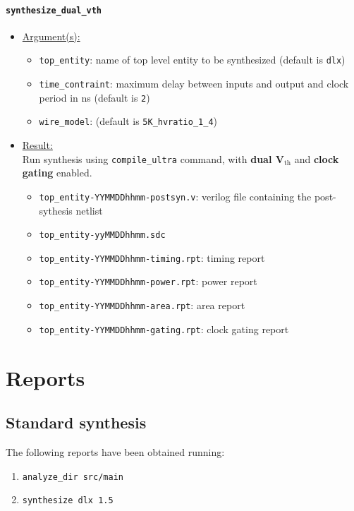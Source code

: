 \paragraph{\texttt{synthesize\_dual\_vth}}
\begin{itemize}
	\item \underline{Argument(s):}
		\begin{itemize}
			\item \texttt{top\_entity}: name of top level entity to
				be synthesized (default is \texttt{dlx})
			\item \texttt{time\_contraint}: maximum delay between
				inputs and output and clock period in ns
				(default is \texttt{2})
			\item \texttt{wire\_model}: (default is \texttt{5K\_hvratio\_1\_4})
		\end{itemize}
	\item \underline{Result:} \\
		Run synthesis using \texttt{compile\_ultra} command, with
		\textbf{dual V$_{\text{th}}$} and \textbf{clock gating} enabled.
		\begin{itemize}
			\item \texttt{top\_entity-YYMMDDhhmm-postsyn.v}: verilog
				file containing the post-sythesis netlist
			\item \texttt{top\_entity-yyMMDDhhmm.sdc}
			\item \texttt{top\_entity-YYMMDDhhmm-timing.rpt}: timing
				report
			\item \texttt{top\_entity-YYMMDDhhmm-power.rpt}: power
				report
			\item \texttt{top\_entity-YYMMDDhhmm-area.rpt}: area
				report
			\item \texttt{top\_entity-YYMMDDhhmm-gating.rpt}: clock
				gating report
		\end{itemize}
\end{itemize}

\section{Reports}
\subsection{Standard synthesis}
\label{subsec:std_syn}
The following reports have been obtained running:
\begin{enumerate}
	\item \texttt{analyze\_dir src/main}
	\item \texttt{synthesize dlx 1.5}
\end{enumerate}

